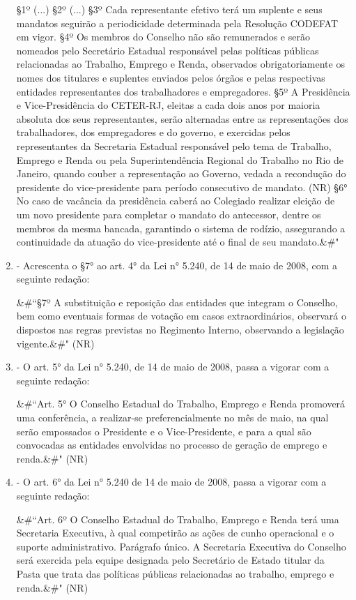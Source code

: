 \documentclass[10pt]{article}
\begin{document}
\begin{enumerate}[label=\Roman*]
§1º (...)
§2º (...)
§3º Cada representante efetivo terá um suplente e seus mandatos seguirão a periodicidade determinada pela Resolução CODEFAT em vigor. 
§4º Os membros do Conselho não são remunerados e serão nomeados pelo Secretário Estadual responsável pelas políticas públicas relacionadas ao Trabalho, Emprego e Renda, observados obrigatoriamente os nomes dos titulares e suplentes enviados pelos órgãos e pelas respectivas entidades representantes dos trabalhadores e empregadores.
§5º A Presidência e Vice-Presidência do CETER-RJ, eleitas a cada dois anos por maioria absoluta dos seus representantes, serão alternadas entre as representações dos trabalhadores, dos empregadores e do governo, e exercidas pelos representantes da Secretaria Estadual responsável pelo tema de Trabalho, Emprego e Renda ou pela Superintendência Regional do Trabalho no Rio de Janeiro, quando couber a representação ao Governo, vedada a recondução do presidente do vice-presidente para período consecutivo de mandato. (NR)
§6° No caso de vacância da presidência caberá ao Colegiado realizar eleição de um novo presidente para completar o mandato do antecessor, dentre os membros da mesma bancada, garantindo o sistema de rodízio, assegurando a continuidade da atuação do vice-presidente até o final de seu mandato.&#" 

\item - Acrescenta o §7° ao art. 4° da Lei n° 5.240, de 14 de maio de 2008, com a seguinte redação:

&#``§7º A substituição e reposição das entidades que integram o Conselho, bem como eventuais formas de votação em casos extraordinários, observará o dispostos nas regras previstas no Regimento Interno, observando a legislação vigente.&#" (NR)

\item - O art. 5° da Lei n° 5.240, de 14 de maio de 2008, passa a vigorar com a seguinte redação:

&#``Art. 5° O Conselho Estadual do Trabalho, Emprego e Renda promoverá uma conferência, a realizar-se preferencialmente no mês de maio, na qual serão empossados o Presidente e o Vice-Presidente, e para a qual são convocadas as entidades envolvidas no processo de geração de emprego e renda.&#" (NR)

\item - O art. 6° da Lei n° 5.240 de 14 de maio de 2008, passa a vigorar com a seguinte redação:

&#``Art. 6º O Conselho Estadual do Trabalho, Emprego e Renda terá uma Secretaria Executiva, à qual competirão as ações de cunho operacional e o suporte administrativo.
Parágrafo único. A Secretaria Executiva do Conselho será exercida pela equipe designada pelo Secretário de Estado titular da Pasta que trata das políticas públicas relacionadas ao trabalho, emprego e renda.&#" (NR)


\end{enumerate}
\end{document}
